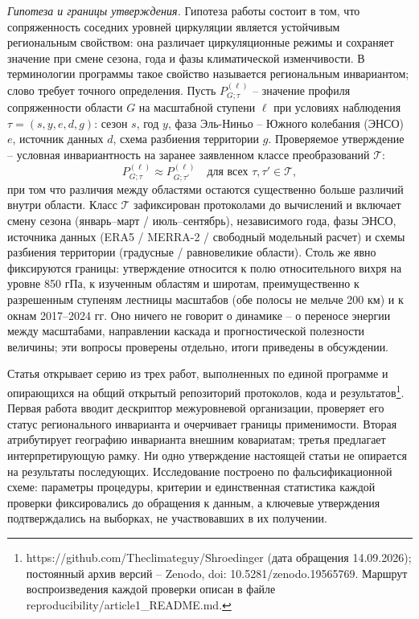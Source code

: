 \documentclass[12pt,a4paper]{article}
\begin{document}
\emph{Гипотеза и границы утверждения.} Гипотеза работы состоит в том, что сопряженность соседних уровней циркуляции является устойчивым региональным свойством: она различает циркуляционные режимы и сохраняет значение при смене сезона, года и фазы климатической изменчивости. В терминологии программы \cite{Puzachenko2010} такое свойство называется региональным инвариантом; слово требует точного определения. Пусть $P^{(\ell)}_{G;\tau}$ -- значение профиля сопряженности области $G$ на масштабной ступени $\ell$ при условиях наблюдения $\tau = (s, y, e, d, g)$: сезон $s$, год $y$, фаза Эль-Ниньо -- Южного колебания (ЭНСО) $e$, источник данных $d$, схема разбиения территории $g$. Проверяемое утверждение -- условная инвариантность на заранее заявленном классе преобразований $\mathcal{T}$:
\begin{equation}
\label{eq:inv}
P^{(\ell)}_{G;\tau} \approx P^{(\ell)}_{G;\tau'} \quad \text{для всех } \tau, \tau' \in \mathcal{T},
\end{equation}
при том что различия между областями остаются существенно больше различий внутри области. Класс $\mathcal{T}$ зафиксирован протоколами до вычислений и включает смену сезона (январь--март / июль--сентябрь), независимого года, фазы ЭНСО, источника данных (ERA5 / MERRA-2 / свободный модельный расчет) и схемы разбиения территории (градусные / равновеликие области). Столь же явно фиксируются границы: утверждение относится к полю относительного вихря на уровне 850 гПа, к изученным областям и широтам, преимущественно к разрешенным ступеням лестницы масштабов (обе полосы не мельче 200 км) и к окнам 2017--2024 гг. Оно ничего не говорит о динамике -- о переносе энергии между масштабами, направлении каскада и прогностической полезности величины; эти вопросы проверены отдельно, итоги приведены в обсуждении.

Статья открывает серию из трех работ, выполненных по единой программе и опирающихся на общий открытый репозиторий протоколов, кода и результатов\footnote{https://github.com/Theclimateguy/Shroedinger (дата обращения 14.09.2026); постоянный архив версий -- Zenodo, doi: 10.5281/zenodo.19565769. Маршрут воспроизведения каждой проверки описан в файле reproducibility/article1\_README.md.}. Первая работа вводит дескриптор межуровневой организации, проверяет его статус регионального инварианта и очерчивает границы применимости. Вторая атрибутирует географию инварианта внешним ковариатам; третья предлагает интерпретирующую рамку. Ни одно утверждение настоящей статьи не опирается на результаты последующих. Исследование построено по фальсификационной схеме: параметры процедуры, критерии и единственная статистика каждой проверки фиксировались до обращения к данным, а ключевые утверждения подтверждались на выборках, не участвовавших в их получении.
\end{document}
